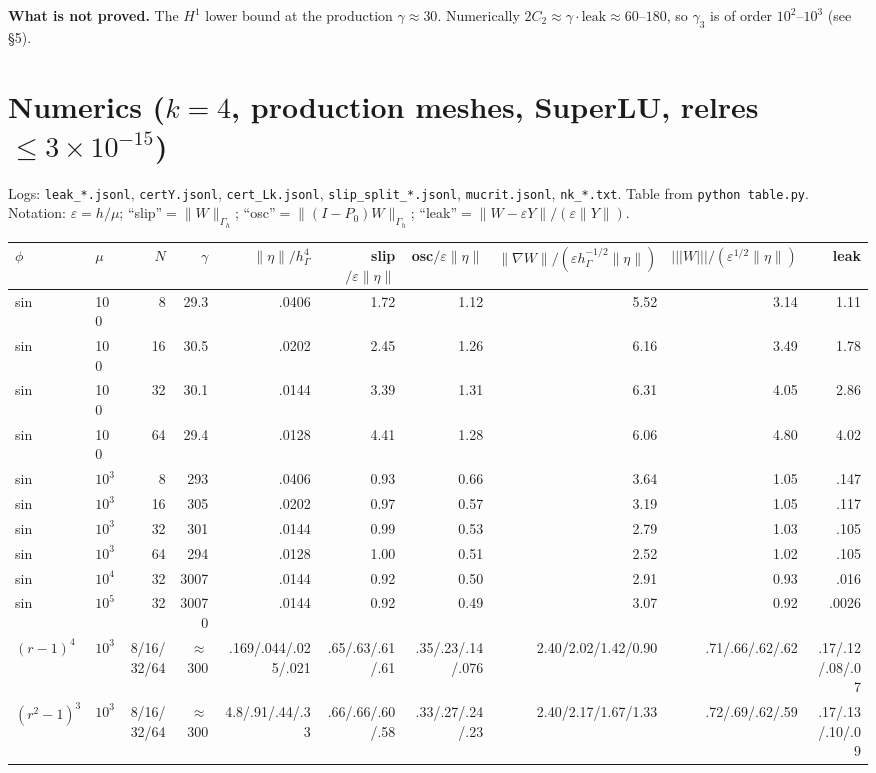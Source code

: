 \documentclass[11pt]{article}
\theoremstyle{remark}
\newcommand{\tn}[1]{|\!|\!|#1|\!|\!|}
\newcommand{\hG}{h_\Gamma}
\newcommand{\Gh}{\Gamma_h}
\begin{document}
\noindent\textbf{What is not proved.} The $H^1$ lower bound at the production $\gamma\approx30$. Numerically
$2C_2\approx\gamma\cdot\mathrm{leak}\approx60$--$180$, so $\gamma_3$ is of order $10^2$--$10^3$ (see §5).

\section{Numerics ($k=4$, production meshes, SuperLU, relres $\le3\times10^{-15}$)}
Logs: \texttt{leak\_*.jsonl}, \texttt{certY.jsonl}, \texttt{cert\_Lk.jsonl}, \texttt{slip\_split\_*.jsonl},
\texttt{mucrit.jsonl}, \texttt{nk\_*.txt}. Table from \texttt{python table.py}.
Notation: $\varepsilon=h/\mu$; ``slip''$=\|W\|_{\Gh}$; ``osc''$=\|(I-P_0)W\|_{\Gh}$; ``leak''$=\|W-\varepsilon Y\|/(\varepsilon\|Y\|)$.

\begin{center}\small
\begin{tabular}{llrrrrrrrr}\toprule
$\phi$ & $\mu$ & $N$ & $\gamma$ & $\|\eta\|/\hG^4$ & slip$/\varepsilon\|\eta\|$ & osc$/\varepsilon\|\eta\|$ & $\|\nabla W\|/(\varepsilon\hG^{-1/2}\|\eta\|)$ & $\tn W/(\varepsilon^{1/2}\|\eta\|)$ & leak\\\midrule
sin & 100 & 8 & 29.3 & .0406 & 1.72 & 1.12 & 5.52 & 3.14 & 1.11\\
sin & 100 & 16 & 30.5 & .0202 & 2.45 & 1.26 & 6.16 & 3.49 & 1.78\\
sin & 100 & 32 & 30.1 & .0144 & 3.39 & 1.31 & 6.31 & 4.05 & 2.86\\
sin & 100 & 64 & 29.4 & .0128 & 4.41 & 1.28 & 6.06 & 4.80 & 4.02\\
sin & $10^3$ & 8 & 293 & .0406 & 0.93 & 0.66 & 3.64 & 1.05 & .147\\
sin & $10^3$ & 16 & 305 & .0202 & 0.97 & 0.57 & 3.19 & 1.05 & .117\\
sin & $10^3$ & 32 & 301 & .0144 & 0.99 & 0.53 & 2.79 & 1.03 & .105\\
sin & $10^3$ & 64 & 294 & .0128 & 1.00 & 0.51 & 2.52 & 1.02 & .105\\
sin & $10^4$ & 32 & 3007 & .0144 & 0.92 & 0.50 & 2.91 & 0.93 & .016\\
sin & $10^5$ & 32 & 30070 & .0144 & 0.92 & 0.49 & 3.07 & 0.92 & .0026\\
$(r-1)^4$ & $10^3$ & 8/16/32/64 & $\approx$300 & .169/.044/.025/.021 & .65/.63/.61/.61 & .35/.23/.14/.076 & 2.40/2.02/1.42/0.90 & .71/.66/.62/.62 & .17/.12/.08/.07\\
$(r^2-1)^3$ & $10^3$ & 8/16/32/64 & $\approx$300 & 4.8/.91/.44/.33 & .66/.66/.60/.58 & .33/.27/.24/.23 & 2.40/2.17/1.67/1.33 & .72/.69/.62/.59 & .17/.13/.10/.09\\
\bottomrule\end{tabular}\end{center}
\end{document}
